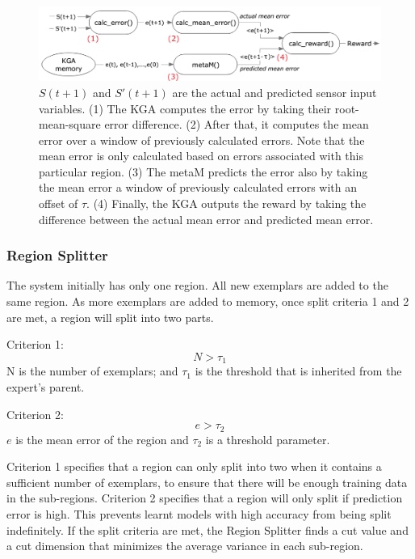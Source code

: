 \begin{figure}[htb]
	\centering
	\includegraphics[width=1.0 \textwidth]{"fig/cbla/Block Diagram KGA"}
	\caption[Block diagram of the Knowledge Gain Assessor]{$S(t+1)$ and $S'(t+1)$ are the actual and predicted sensor input variables. (1) The KGA computes the error by taking their root-mean-square error difference. (2) After that, it computes the mean error over a window of previously calculated errors. Note that the mean error is only calculated based on errors associated with this particular region. (3) The metaM predicts the error also by taking the mean error a window of previously calculated errors with an offset of $\tau$. (4) Finally, the KGA outputs the reward by taking the difference between the actual mean error and predicted mean error. }
	\label{fig:Block Diagram KGA}
\end{figure}


\FloatBarrier
\subsubsection{Region Splitter}

The system initially has only one region. All new exemplars are added to the same region. As more exemplars are added to memory, once split criteria 1 and 2 are met, a region will split into two parts.

Criterion 1: 
\begin{equation}\label{eqn:split-criterion1}
	N>\tau_1
\end{equation}
N is the number of exemplars; and $\tau_1$ is the threshold that is inherited from the expert's parent. 

Criterion 2:	
\begin{equation}\label{eqn:split-criterion2}
	 e>\tau_2
\end{equation}	
$e$ is the mean error of the region and $\tau_2$ is a threshold parameter. 

Criterion 1 specifies that a region can only split into two when it contains a sufficient number of exemplars, to ensure that there will be enough training data in the sub-regions. Criterion 2 specifies that a region will only split if prediction error is high. This prevents learnt models with high accuracy from being split indefinitely. 
If the split criteria are met, the Region Splitter finds a cut value and a cut dimension that minimizes the average variance in each sub-region. 

